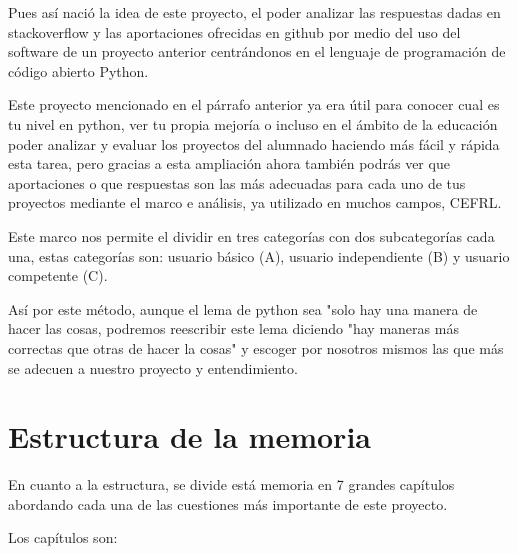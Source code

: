 \documentclass[a4paper, 12pt]{book}
\begin{document}
Pues así nació la idea de este proyecto, el poder analizar las respuestas dadas en stackoverflow y las aportaciones ofrecidas en github por medio del uso del software de un proyecto anterior centrándonos en el lenguaje de programación de código abierto Python.

Este proyecto mencionado en el párrafo anterior ya era útil para conocer cual es tu nivel en python, ver tu propia mejoría o incluso en el ámbito de la educación poder analizar y evaluar los proyectos del alumnado haciendo más fácil y rápida esta tarea, pero gracias a esta ampliación ahora también podrás ver que aportaciones o que respuestas son las más adecuadas para cada uno de tus proyectos mediante el marco e análisis, ya utilizado en muchos campos, CEFRL.

Este marco nos permite el dividir en tres categorías con dos subcategorías cada una, estas categorías son: usuario básico (A), usuario independiente (B) y usuario competente (C).

Así por este método, aunque el lema de python sea "solo hay una manera de hacer las cosas, podremos reescribir este lema diciendo "hay maneras más correctas que otras de hacer la cosas" y escoger por nosotros mismos las que más se adecuen a nuestro proyecto y entendimiento.

\section{Estructura de la memoria}
\label{sec:estructura}

En cuanto a la estructura, se divide está memoria en 7 grandes capítulos abordando cada una de las cuestiones más importante de este proyecto.

Los capítulos son:
\end{document}
